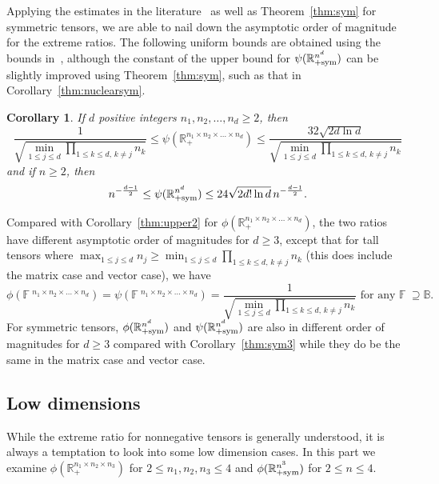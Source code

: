 \documentclass[11pt]{article}
\newtheorem{corollary}[theorem]{Corollary}
\newcommand{\BB}{\mathbb{B}}
\newcommand{\R}{\mathbb{R}}
\newcommand{\BF}{\mathbb{F}\:\!}
\newcommand{\sym}{\textnormal{sym}}
\begin{document}
Applying the estimates in the literature~\cite{LNSU18,KT22} as well as Theorem~\ref{thm:sym} for symmetric tensors, we are able to nail down the asymptotic order of magnitude for the extreme ratios. The following uniform bounds are obtained using the bounds in~\cite{KT22}, although the constant of the upper bound for $\psi(\R^{n^d}_{+\sym})$ can be slightly improved using Theorem~\ref{thm:sym}, such as that in Corollary~\ref{thm:nuclearsym}.
\begin{corollary}\label{thm:nuclear+}
If $d$ positive integers $n_1,n_2,\dots,n_d\ge2$, then
$$
\frac{1}{\sqrt{\min_{1\le j\le d}\prod_{1\le k\le d,\,k\neq j}n_k}} \le \psi(\R^{n_1\times n_2\times \dots \times n_d}_+)
\le \frac{32\sqrt{2d\ln d}}{\sqrt{\min_{1\le j\le d}\prod_{1\le k\le d,\,k\neq j}n_k}}
$$
and if $n\ge2$, then
$$
n^{-\frac{d-1}{2}} \le \psi(\R^{n^d}_{+\sym}) \le 24\sqrt{2d!\ln d}\,n^{-\frac{d-1}{2}}.
$$
\end{corollary}

Compared with Corollary~\ref{thm:upper2} for $\phi(\R^{n_1\times n_2\times \dots \times n_d}_+)$, the two ratios have different asymptotic order of magnitudes for $d\ge3$, except that for tall tensors where
$\max_{1\le j\le d}n_j \ge \min_{1\le j\le d} \prod_{1\le k\le d,\,k\neq j}n_k$ (this does include the matrix case and vector case), we have
$$
\phi(\BF^{n_1\times n_2\times \dots \times n_d})=\psi(\BF^{n_1\times n_2\times \dots \times n_d})=\frac{1}{\sqrt{\min_{1\le j\le d}\prod_{1\le k\le d,\,k\neq j}n_k}} \mbox{ for any } \BF\supseteq\BB.
$$
For symmetric tensors, $\phi(\R^{n^d}_{+\sym})$ and $\psi(\R^{n^d}_{+\sym})$ are also in different order of magnitudes for $d\ge3$ compared with Corollary~\ref{thm:sym3} while they do be the same in the matrix case and vector case.

\subsection{Low dimensions}

While the extreme ratio for nonnegative tensors is generally understood, it is always a temptation to look into some low dimension cases. In this part we examine $\phi(\R^{n_1\times n_2\times n_3}_+)$ for $2\le n_1,n_2,n_3\le 4$ and $\phi(\R^{n^3}_{+\sym})$ for $2\le n\le 4$.
\end{document}

